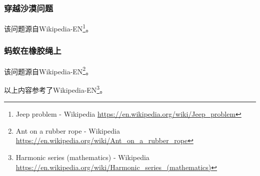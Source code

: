 \subsubsection{穿越沙漠问题}
该问题源自Wikipedia-EN\footnote{Jeep problem - Wikipedia
\url{https://en.wikipedia.org/wiki/Jeep\_problem}}。
\subsubsection{蚂蚁在橡胶绳上}
该问题源自Wikipedia-EN\footnote{Ant on a rubber rope - Wikipedia
\url{https://en.wikipedia.org/wiki/Ant\_on\_a\_rubber\_rope}}。

以上内容参考了Wikipedia-EN\footnote{Harmonic series (mathematics) - Wikipedia
\url{https://en.wikipedia.org/wiki/Harmonic\_series\_(mathematics)}}。
